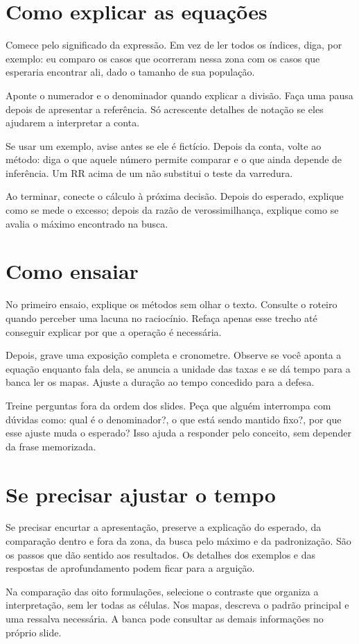 \documentclass[11pt,a4paper]{article}
\begin{document}
\section*{Como explicar as equações}
Comece pelo significado da expressão. Em vez de ler todos os índices, diga, por exemplo: eu comparo os casos que ocorreram nessa zona com os casos que esperaria encontrar ali, dado o tamanho de sua população.

Aponte o numerador e o denominador quando explicar a divisão. Faça uma pausa depois de apresentar a referência. Só acrescente detalhes de notação se eles ajudarem a interpretar a conta.

Se usar um exemplo, avise antes se ele é fictício. Depois da conta, volte ao método: diga o que aquele número permite comparar e o que ainda depende de inferência. Um RR acima de um não substitui o teste da varredura.

Ao terminar, conecte o cálculo à próxima decisão. Depois do esperado, explique como se mede o excesso; depois da razão de verossimilhança, explique como se avalia o máximo encontrado na busca.
\section*{Como ensaiar}
No primeiro ensaio, explique os métodos sem olhar o texto. Consulte o roteiro quando perceber uma lacuna no raciocínio. Refaça apenas esse trecho até conseguir explicar por que a operação é necessária.

Depois, grave uma exposição completa e cronometre. Observe se você aponta a equação enquanto fala dela, se anuncia a unidade das taxas e se dá tempo para a banca ler os mapas. Ajuste a duração ao tempo concedido para a defesa.

Treine perguntas fora da ordem dos slides. Peça que alguém interrompa com dúvidas como: qual é o denominador?, o que está sendo mantido fixo?, por que esse ajuste muda o esperado? Isso ajuda a responder pelo conceito, sem depender da frase memorizada.
\section*{Se precisar ajustar o tempo}
Se precisar encurtar a apresentação, preserve a explicação do esperado, da comparação dentro e fora da zona, da busca pelo máximo e da padronização. São os passos que dão sentido aos resultados. Os detalhes dos exemplos e das respostas de aprofundamento podem ficar para a arguição.

Na comparação das oito formulações, selecione o contraste que organiza a interpretação, sem ler todas as células. Nos mapas, descreva o padrão principal e uma ressalva necessária. A banca pode consultar as demais informações no próprio slide.
\end{document}
